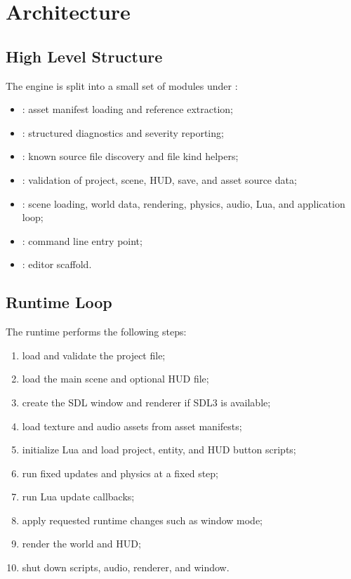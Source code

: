 \chapter{Architecture}

\section{High Level Structure}

The engine is split into a small set of modules under :

\begin{itemize}
  \item {}: asset manifest loading and reference extraction;
  \item {}: structured diagnostics and severity reporting;
  \item {}: known source file discovery and file kind helpers;
  \item {}: validation of project, scene, HUD, save, and asset source data;
  \item {}: scene loading, world data, rendering, physics, audio, Lua, and application loop;
  \item {}: command line entry point;
  \item {}: editor scaffold.
\end{itemize}

\section{Runtime Loop}

The runtime performs the following steps:

\begin{enumerate}
  \item load and validate the project file;
  \item load the main scene and optional HUD file;
  \item create the SDL window and renderer if SDL3 is available;
  \item load texture and audio assets from asset manifests;
  \item initialize Lua and load project, entity, and HUD button scripts;
  \item run fixed updates and physics at a fixed step;
  \item run Lua update callbacks;
  \item apply requested runtime changes such as window mode;
  \item render the world and HUD;
  \item shut down scripts, audio, renderer, and window.
\end{enumerate}

